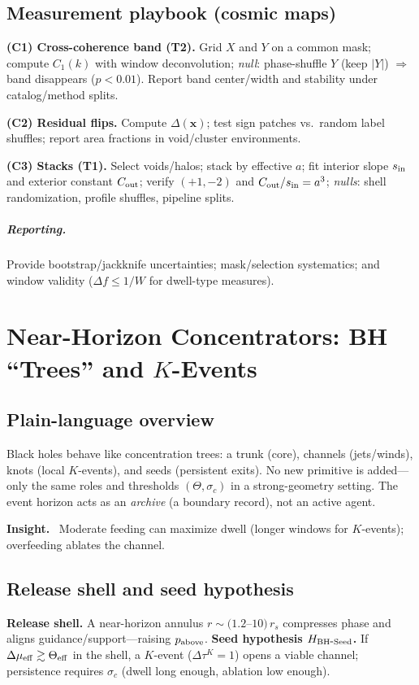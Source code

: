 \documentclass[12pt,a4paper,oneside]{scrreprt}
\newenvironment{insight}{\par\vspace{0.5em}\noindent\textbf{Insight.}\ }{\par\vspace{0.5em}}
\begin{document}
\section{Measurement playbook (cosmic maps)}\label{sec:lss-playbook}
\textbf{(C1) Cross-coherence band (T2).} 
Grid $X$ and $Y$ on a common mask; compute $C_1(k)$ with window deconvolution; 
\emph{null}: phase-shuffle $Y$ (keep $|Y|$) $\Rightarrow$ band disappears ($p<0.01$). 
Report band center/width and stability under catalog/method splits.

\textbf{(C2) Residual flips.}
Compute $\Delta(\mathbf x)$; test sign patches vs.\ random label shuffles; report area fractions in void/cluster environments.

\textbf{(C3) Stacks (T1).}
Select voids/halos; stack by effective $a$; fit interior slope $s_{\rm in}$ and exterior constant $C_{\rm out}$; verify $(+1,-2)$ and $C_{\rm out}/s_{\rm in}=a^3$; 
\emph{nulls}: shell randomization, profile shuffles, pipeline splits.

\paragraph{Reporting.}
Provide bootstrap/jackknife uncertainties; mask/selection systematics; and window validity ($\Delta f\le 1/W$ for dwell-type measures).

\chapter{Near-Horizon Concentrators: BH ``Trees'' and $K$-Events}\label{ch:bh-tree}

\section*{Plain-language overview}
Black holes behave like concentration trees: a trunk (core), channels (jets/winds), knots (local $K$-events), and seeds (persistent exits). 
No new primitive is added—only the same roles and thresholds $(\Theta,\sigma_c)$ in a strong-geometry setting.
The event horizon acts as an \emph{archive} (a boundary record), not an active agent.

\begin{insight}
Moderate feeding can maximize dwell (longer windows for $K$-events); overfeeding ablates the channel.
\end{insight}

\section{Release shell and seed hypothesis}\label{sec:bh-release}
\textbf{Release shell.} A near-horizon annulus $r\sim(1.2$–$10)\,r_s$ compresses phase and aligns guidance/support—raising $p_{\rm above}$.
\textbf{Seed hypothesis $H_{\rm BH\mbox{-}Seed}$.} 
If $\Delta\mu_{\rm eff}\gtrsim\Theta_{\rm eff}$ in the shell, a $K$-event ($\Delta\tau^K=1$) opens a viable channel; persistence requires $\sigma_c$ (dwell long enough, ablation low enough).
\end{document}

